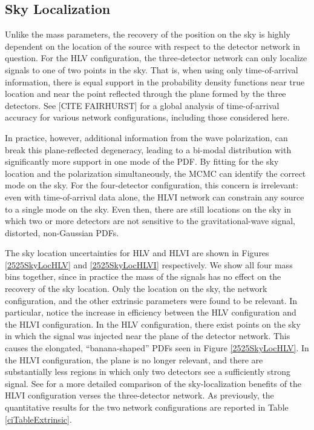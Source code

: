 \documentclass[11pt,a4paper]{emulateapj}
\newcommand{\carl}[1]{{\color{red}  #1}}
\begin{document}
\subsection{Sky Localization}
\label{skySection}
 
Unlike the mass parameters, the recovery of the position on the sky is highly dependent 
on the location of the source with respect to the detector network in question. 
For the HLV configuration, the three-detector network can only localize signals to one of
two points in the sky.  That is, when using only time-of-arrival information, there is 
equal support in the probability density functions near true location and near the 
point reflected through the plane formed by the three detectors.  See  \carl{[CITE FAIRHURST]} for
 a global analysis of time-of-arrival accuracy for various network configurations, including those considered
 here.  
  
  
  In practice, however, additional information from the wave polarization, can break this plane-reflected degeneracy,
   leading to a bi-modal distribution with significantly more support in one mode of the PDF.
     By fitting for the sky location and the polarization simultaneously, the MCMC can identify
   the correct mode on the sky.  For the four-detector configuration, this concern is irrelevant: even with time-of-arrival
   data alone, the HLVI network can constrain any source to a single mode on the sky.  Even then, there are still locations 
   on the sky in which two or more detectors are not sensitive to the gravitational-wave signal, distorted, non-Gaussian PDFs.  

The sky location uncertainties for HLV and HLVI are shown in Figures \ref{2525SkyLocHLV}
 and \ref{2525SkyLocHLVI} respectively.  We show all four mass bins together, since in practice
  the mass of the signals has no effect on the recovery of the sky location.  Only the location on 
  the sky, the network configuration, and the other extrinsic parameters were found to be relevant.  
  In particular, notice the increase in efficiency between the HLV configuration and the HLVI 
  configuration.  In the HLV configuration, there exist points on the sky in which the signal was injected
  near the plane of the detector network.  This causes the elongated, ``banana-shaped'' PDFs seen in
  Figure \ref{2525SkyLocHLV}.  In the HLVI configuration, the plane is no longer relevant, and there are substantially
  less regions in which only two detectors see a sufficiently strong signal.  
  See \cite{Veitch2012} for a more detailed comparison of the sky-localization benefits of the HLVI 
  configuration verses the three-detector network.  As previously, the quantitative results for the two network configurations
  are reported in Table \ref{ciTableExtrinsic}.
\end{document}
